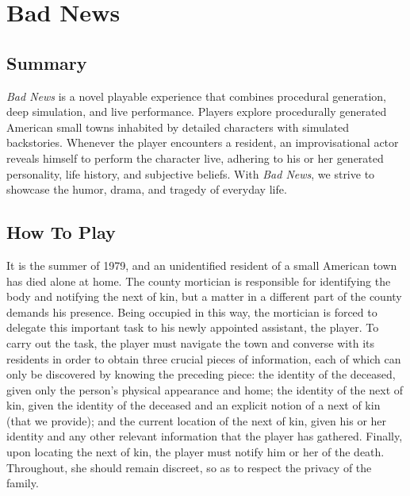 \documentclass[letterpaper]{article}
\begin{document}
\section{Bad News}
\subsection{Summary}
\textit{Bad News} is a novel playable experience that combines procedural generation, deep simulation, and live performance. Players explore procedurally generated American small towns inhabited by detailed characters with simulated backstories. Whenever the player encounters a resident, an improvisational actor reveals himself to perform the character live, adhering to his or her generated personality, life history, and subjective beliefs. With \textit{Bad News}, we strive to showcase the humor, drama, and tragedy of everyday life.


\subsection{How To Play}

It is the summer of 1979, and an unidentified resident of a small American town has died alone at home. The county mortician is responsible for identifying the body and notifying the next of kin, but a matter in a different part of the county demands his presence. Being occupied in this way, the mortician is forced to delegate this important task to his newly appointed assistant, the player. To carry out the task, the player must navigate the town and converse with its residents in order to obtain three crucial pieces of information, each of which can only be discovered by knowing the preceding piece: the identity of the deceased, given only the person's physical appearance and home; the identity of the next of kin, given the identity of the deceased and an explicit notion of a next of kin (that we provide); and the current location of the next of kin, given his or her identity and any other relevant information that the player has gathered. Finally, upon locating the next of kin, the player must notify him or her of the death. Throughout, she should remain discreet, so as to respect the privacy of the family.
\end{document}

